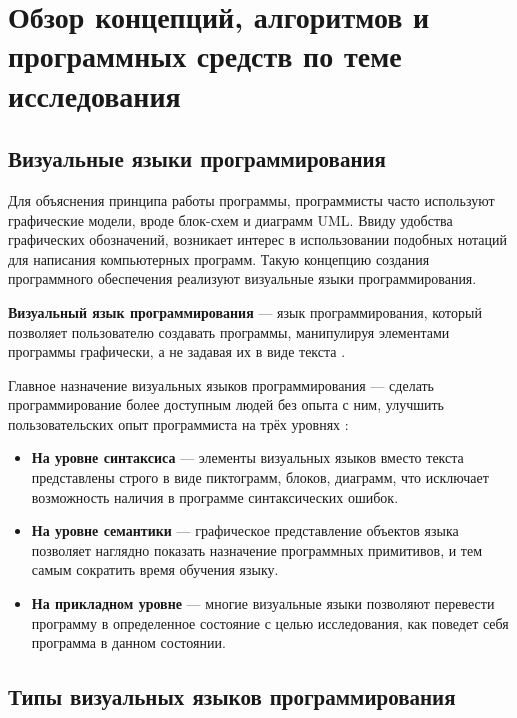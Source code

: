 \chapter{Обзор концепций, алгоритмов и программных средств по теме исследования}\label{ch:ch1}

\section{Визуальные языки программирования}\label{sec:ch1/sec1}

Для объяснения принципа работы программы, программисты часто используют
графические модели, вроде блок-схем и диаграмм UML. Ввиду удобства графических
обозначений, возникает интерес в использовании подобных нотаций для
написания компьютерных программ. Такую концепцию создания программного обеспечения
реализуют визуальные языки программирования.

\textbf{Визуальный язык программирования} --- язык программирования, 
который позволяет пользователю создавать программы, манипулируя элементами
программы графически, а не задавая их в виде текста \cite{maturityofvpl}.

Главное назначение визуальных языков программирования --- сделать 
программирование более доступным людей без опыта с ним,
улучшить пользовательских опыт программиста на трёх уровнях \cite{agentsheetsmovingbeyondsyntax}:

\begin{itemize}
    \item \textbf{На уровне синтаксиса} --- элементы визуальных языков вместо текста 
    представлены строго в виде пиктограмм, блоков, диаграмм, что исключает возможность
    наличия в программе синтаксических ошибок.
    \item \textbf{На уровне семантики} --- графическое представление объектов
    языка позволяет наглядно показать назначение программных примитивов, и тем
    самым сократить время обучения языку.
    \item \textbf{На прикладном уровне} --- многие визуальные языки позволяют
    перевести программу в определенное состояние с целью исследования, как поведет
    себя программа в данном состоянии.
\end{itemize}

\section{Типы визуальных языков программирования}\label{sec:ch1/sec2}

